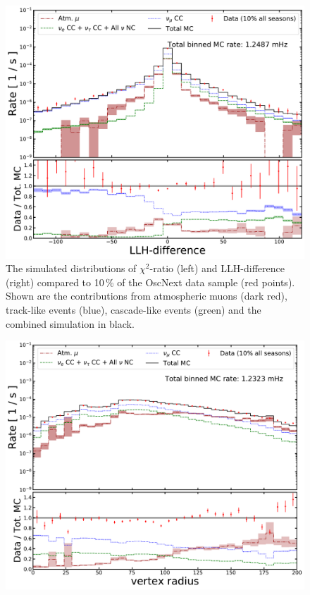 \begin{appendices}
\begin{figure}[h]
    \includegraphics[width=0.75\linewidth]{figures/L7_SANTA_classifier_leerapid_14_bigger.pdf}
    \caption[The simulated distributions of $\chi^2$-ratio (left) and LLH-difference (right) compared to 10\,\% of the OscNext data sample]{The simulated distributions of $\chi^2$-ratio (left) and LLH-difference (right) compared to 10\,\% of the OscNext data sample (red points). Shown are the contributions from atmospheric muons (dark red), track-like events (blue), cascade-like events (green) and the combined simulation in black.}
    \label{fig:data_mc_chi2_llhdiff}
\end{figure}

\begin{figure}[h]
	\centering
    \includegraphics[width=0.75\linewidth]{figures/L7_SANTA_classifier_rho36start_14_bigger.pdf}
    

\end{figure}
\end{appendices}
